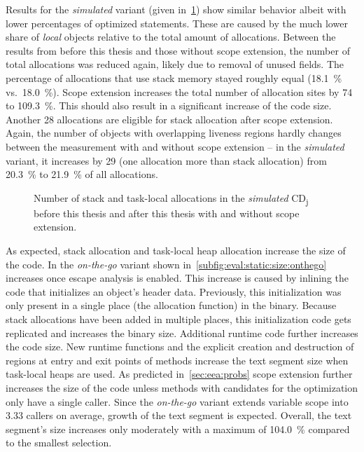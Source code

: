 		Results for the \emph{simulated} variant (given in~\cref{fig:eval:static:numallocs:simulated}) show similar behavior
		albeit with lower percentages of optimized statements. These are caused by the much lower share of \emph{local}
		objects relative to the total amount of allocations. Between the results from before this thesis and those without
		scope extension, the number of total allocations was reduced again, likely due to removal of unused fields. The
		percentage of allocations that use stack memory stayed roughly equal (18.1~\% vs.~18.0~\%). Scope extension
		increases the total number of allocation sites by 74 to 109.3~\%. This should also result in a significant increase
		of the code size. Another 28 allocations are eligible for stack allocation after scope extension. Again, the number
		of objects with overlapping liveness regions hardly changes between the measurement with and without scope extension
		– in the \emph{simulated} variant, it increases by 29 (one allocation more than stack allocation) from 20.3~\% to
		21.9~\% of all allocations.

		\begin{figure}
			\centering
			

			\caption[Number of stack and task-local allocations in \emph{simulated} CD\textsubscript{j}]{%
				Number of stack and task-local allocations in the \emph{simulated} CD\textsubscript{j} before this thesis and
				after this thesis with and without scope extension.}
			\label{fig:eval:static:numallocs:simulated}
		\end{figure}

		As expected, stack allocation and task-local heap allocation increase the size of the code. In the \emph{on-the-go}
		variant shown in~\cref{subfig:eval:static:size:onthego} increases once escape analysis is enabled. This increase is
		caused by inlining the code that initializes an object's header data. Previously, this initialization was only
		present in a single place (the allocation function) in the binary. Because stack allocations have been added in
		multiple places, this initialization code gets replicated and increases the binary size. Additional runtime code
		further increases the code size. New runtime functions and the explicit creation and destruction of regions at entry
		and exit points of methods increase the text segment size when task-local heaps are used. As predicted
		in~\cref{sec:eea:probs} scope extension further increases the size of the code unless methods with candidates for
		the optimization only have a single caller. Since the \emph{on-the-go} variant extends variable scope into 3.33
		callers on average, growth of the text segment is expected. Overall, the text segment's size increases only
		moderately with a maximum of 104.0~\% compared to the smallest selection.

